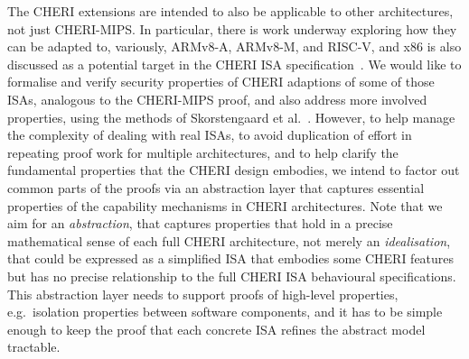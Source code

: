 \documentclass[11pt]{article}
\theoremstyle{definition}
\begin{document}
The CHERI extensions are intended to also be applicable to other
architectures, not just CHERI-MIPS.  In particular, there is work
underway exploring how they can be adapted to, variously, ARMv8-A,
ARMv8-M, and RISC-V, and
x86 is also discussed as a potential target in the CHERI ISA specification~\cite{UCAM-CL-TR-927}.
We would like to formalise and verify security properties of CHERI adaptions
of some of those ISAs, analogous to the CHERI-MIPS proof, and also
address more involved properties, using the methods of Skorstengaard et al.~\cite{DBLP:conf/esop/SkorstengaardDB18}.
However, 
to help manage the complexity of dealing with real ISAs, 
to avoid duplication of effort in repeating proof work for multiple
architectures, and to help clarify the fundamental properties that the
CHERI design embodies, 
we intend to factor out common parts of the proofs via an abstraction layer that captures essential properties of the capability mechanisms in CHERI architectures.
%
Note that we aim for an \emph{abstraction}, that captures properties that
hold in a precise mathematical sense of each
full CHERI architecture, not merely an \emph{idealisation}, that could
be expressed as a simplified ISA that embodies some CHERI features but
has no precise relationship to the full CHERI ISA behavioural
specifications. 
%
This abstraction layer needs to support proofs of high-level properties, e.g.~isolation properties between software components, and it has to be simple enough to keep the proof that each concrete ISA refines the abstract model tractable.
\end{document}
